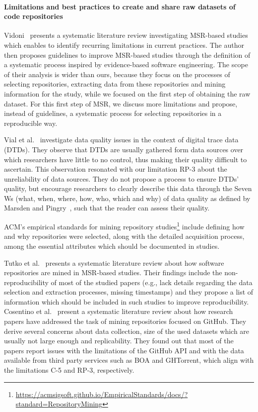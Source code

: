 \paragraph{Limitations and best practices to create and share raw datasets of code repositories}

Vidoni~\cite{vidoni2022systematic} presents a systematic literature review investigating MSR-based studies which enables to identify recurring limitations in current practices.
The author then proposes guidelines to improve MSR-based studies through the definition of a systematic process inspired by evidence-based software engineering.
The scope of their analysis is wider than ours, because they focus on the processes of selecting repositories, extracting data from these repositories and mining information for the study, while we focused on the first step of obtaining the raw dataset.
For this first step of MSR, we discuss more limitations and propose, instead of guidelines, a systematic process for selecting repositories in a reproducible way.

Vial et al.~\cite{vial2019reflections} investigate data quality issues in the context of digital trace data (DTDs).
They observe that DTDs are usually gathered form data sources over which researchers have little to no control, thus making their quality difficult to ascertain. This observation resonated with our limitation RP-3 about the unreliability of data sources. 
They do not propose a process to ensure DTDs’ quality, but encourage researchers to clearly describe this data through the Seven Ws (what, when, where, how, who, which and why) of data quality as defined by Marsden and Pingry~\cite{marsden2018numerical}, such that the reader can assess their quality.

ACM's empirical standards for mining repository studies\footnote{\url{https://acmsigsoft.github.io/EmpiricalStandards/docs/?standard=RepositoryMining}} include defining how and why repositories were selected, along with the detailed acquisition process, among the essential attributes which should be documented in studies.

Tutko et al.~\cite{tutko2022software} presents a systematic literature review about how software repositories are mined in MSR-based studies. Their findings include the non-reproducibility of most of the studied papers (e.g., lack details regarding the data selection and extraction processes, missing timestamps) and they propose a list of information which should be included in such studies to improve reproducibility.
Cosentino et al.~\cite{cosentino2016findings} present a systematic literature review about how research papers have addressed the task of mining repositories focused on GitHub.
They derive several concerns about data collection, size of the used datasets which are usually not large enough and replicability.
They found out that most of the papers report issues with the limitations of the GitHub API and with the data available from third party services such as BOA and GHTorrent, which align with the limitations C-5 and RP-3, respectively.




